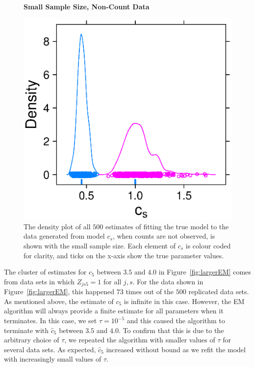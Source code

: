 \documentclass[smallextended]{svjour3}
\begin{document}
\begin{figure}
  \textbf{Small Sample Size, Non-Count Data}\par
  \centering
  \includegraphics[scale=0.75]{smallEM}
  \caption{The density plot of all $500$ estimates of fitting the true model to the data generated from model $c_s$, when counts are not observed, is shown with the small sample size.  Each element of $c_s$ is colour coded for clarity, and ticks on the x-axis show the true parameter values.}
  \label{fig:smallEM}
\end{figure}

The cluster of estimates for $c_5$ between $3.5$ and $4.0$ in Figure~\ref{fig:largerEM} comes from data sets in which $Z_{js5}=1$ for all $j,s$.  For the data shown in Figure~\ref{fig:largerEM}, this happened $73$ times out of the $500$ replicated data sets.  As mentioned above, the estimate of $c_5$ is infinite in this case.  However, the EM algorithm will always provide a finite estimate for all parameters when it terminates.  In this case, we set $\tau=10^{-5}$ and this caused the algorithm to terminate with $\hat c_5$ between $3.5$ and $4.0$.  To confirm that this is due to the arbitrary choice of $\tau$, we repeated the algorithm with smaller values of $\tau$ for several data sets. As expected, $\hat c_5$ increased without bound as we refit the model with increasingly small values of $\tau$.
\end{document}

